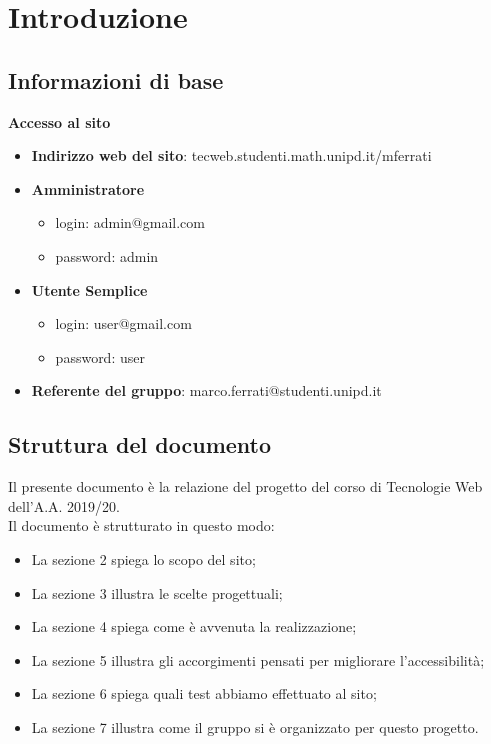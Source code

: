 \documentclass[1_relazione.tex]{subfiles}
\begin{document}
\section{Introduzione}

\subsection{Informazioni di base}
\textbf{Accesso al sito}

\begin{itemize}
\item \textbf{Indirizzo web del sito}: tecweb.studenti.math.unipd.it/mferrati
\item \textbf{Amministratore}
	\begin{itemize}
	\item login: admin@gmail.com
	\item password: admin
	\end{itemize}
\item \textbf{Utente Semplice}
	\begin{itemize}
	\item login: user@gmail.com
	\item password: user
	\end{itemize}
\item \textbf{Referente del gruppo}: marco.ferrati@studenti.unipd.it 
\end{itemize}

\subsection{Struttura del documento}
Il presente documento è la relazione del progetto del corso di Tecnologie Web dell'A.A. 2019/20. \\Il documento è strutturato in questo modo:
\begin{itemize}
	\item La sezione 2 spiega lo scopo del sito;
	\item La sezione 3 illustra le scelte progettuali;
	\item La sezione 4 spiega come è avvenuta la realizzazione;
	\item La sezione 5 illustra gli accorgimenti pensati per migliorare l'accessibilità;
	\item La sezione 6 spiega quali test abbiamo effettuato al sito;
	\item La sezione 7 illustra come il gruppo si è organizzato per questo progetto.
\end{itemize}
\end{document}
